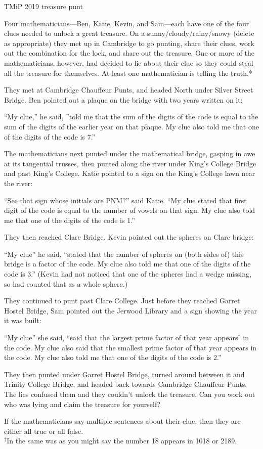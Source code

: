 \documentclass[11pt]{article}
\newcommand{\CDtitle}[1]{
{\setmainfont{Raleway SemiBold}\LARGE #1}\par
}
\newlength{\defaultparskip}
\begin{document}
\hfill%
\begin{minipage}[t][192mm]{132mm}
\setlength{\parskip}{\defaultparskip}

\CDtitle{TMiP 2019 treasure punt}
Four mathematicians---Ben, Katie, Kevin, and Sam---each have one of the four clues needed to unlock a great treasure.
On a sunny/cloudy/rainy/snowy (delete as appropriate) they met up in Cambridge to go punting, share their clues, work out the combination for the lock,
and share out the treasure. One or more of the mathematicians, however, had decided to lie about their clue so they could steal all the treasure for themselves.
At least one mathematician is telling the truth.*


They met at Cambridge Chauffeur Punts, and headed North under Silver Street Bridge. Ben pointed out a plaque on the bridge with two years written on it:

``My clue,'' he said, ''told me that the sum of the digits of the code is equal to the sum of the digits of the earlier year on that plaque. My clue also told me that one of the digits of the code is 7.''

The mathematicians next punted under the mathematical bridge, gasping in awe at its tangential trusses, then punted along the river under King's College Bridge and past King's College.
Katie pointed to a sign on the King's College lawn near the river:

``See that sign whose initials are PNM?'' said Katie. ``My clue stated that first digit of the code is equal to the number of vowels on that sign.
My clue also told me that one of the digits of the code is 1.''

They then reached Clare Bridge. Kevin pointed out the spheres on Clare bridge:

``My clue'' he said, ``stated that the number of spheres on (both sides of) this bridge is a factor of the code. My clue also told me that one of the digits of the code is 3.''
(Kevin had not noticed that one of the spheres had a wedge missing, so had counted that as a whole sphere.)

They continued to punt past Clare College. Just before they reached Garret Hostel Bridge, Sam pointed out the Jerwood Library and a sign showing the year it was built:

``My clue'' she said, ``said that the largest prime factor of that year appears$^\text{†}$ in the code.
My clue also said that the smallest prime factor of that year appears in the code. My clue also told me that one of the digits of the code is 2.''

They then punted under Garret Hostel Bridge, turned around between it and Trinity College Bridge, and headed back towards Cambridge Chauffeur Punts.
The lies confused them and they couldn't unlock the treasure. Can you work out who was lying and claim the treasure for yourself?

\vfill

{\footnotesize *If the mathematicians say multiple sentences about their clue, then they are either all true or all false.\\[-1mm]
$^\text{†}$In the same was as you might say the number 18 appears in 1018 or 2189.}
\end{minipage}
\end{document}
